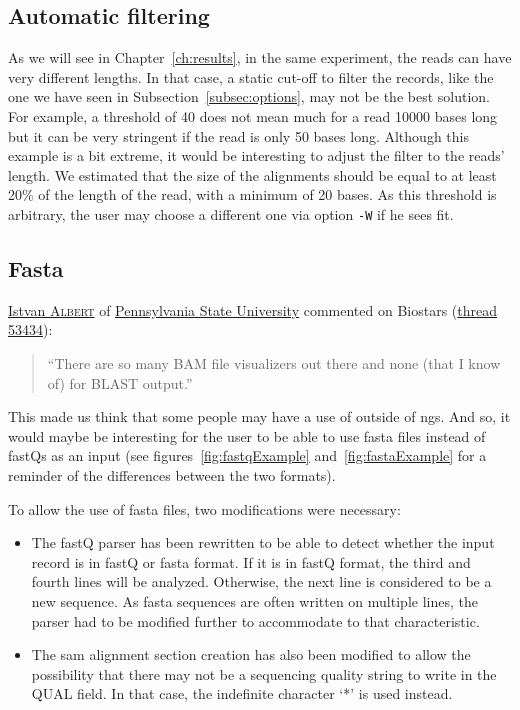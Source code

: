 \subsection{Automatic filtering}\label{subsec:autofilter}
As we will see in Chapter~\ref{ch:results}, in the same experiment, the reads can have very different lengths.
In that case, a static cut-off to filter the records, like the one we have seen in Subsection~\ref{subsec:options}, may not be the best solution.
For example, a threshold of 40 does not mean much for a read 10000 bases long but it can be very stringent if the read is only 50 bases long.
Although this example is a bit extreme, it would be interesting to adjust the filter to the reads' length.
We estimated that the size of the alignments should be equal to at least 20\% of the length of the read, with a minimum of 20 bases.
As this threshold is arbitrary, the user may choose a different one via option \texttt{-W} if he sees fit.


\subsection{Fasta}
\href{http://www.personal.psu.edu/iua1/}{Istvan \textsc{Albert}} of \href{http://www.psu.edu/}{Pennsylvania State University} commented on Biostars (\href{https://www.biostars.org/p/53434/}{thread 53434}):
\begin{quote}
``There are so many BAM file visualizers out there and none (that I know of) for BLAST output.''
\end{quote}
This made us think that some people may have a use of \blastobam{} outside of \gls{ngs}.
And so, it would maybe be interesting for the user to be able to use fasta files instead of fastQs as an input
(see figures~\ref{fig:fastqExample} and~\ref{fig:fastaExample} for a reminder of the differences between the two formats).

To allow the use of fasta files, two modifications were necessary:
\begin{itemize}
    \item The fastQ parser has been rewritten to be able to detect whether the input record is in fastQ or fasta format.
    If it is in fastQ format, the third and fourth lines will be analyzed. Otherwise, the next line is considered to be a new sequence.
    As fasta sequences are often written on multiple lines, the parser had to be modified further to accommodate to that characteristic.
    \item The \gls{sam} alignment section creation has also been modified to allow the possibility that there may not be a sequencing quality string to write in the QUAL field.
    In that case, the indefinite character `*' is used instead.
\end{itemize}

